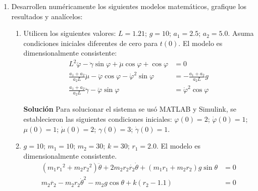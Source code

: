 \documentclass[letterpaper, 12pt]{article}
\begin{document}
\begin{enumerate}
\item Desarrollen numéricamente los siguientes modelos matemáticos, grafique los resultados y analícelos:
\begin{enumerate}
\item Utilicen los siguientes valores:
$L = 1.21$; $g = 10$; $a_1 = 2.5$; $a_2 = 5.0$. Asuma condiciones iniciales diferentes de cero para $t(0)$. El modelo es dimensionalmente consistente:
\begin{equation}
\begin{split}
    L^2\ddot{\varphi} - \ddot{\gamma}\sin \varphi + \ddot{\mu}\cos \varphi + \cos \varphi &= 0 \\
    \frac{a_1+a_2}{a_2L}\ddot{\mu} - \ddot{\varphi}\cos \varphi - \dot{\varphi}^2\sin \varphi &= - \frac{a_1+a_2}{a_2L}g \\
    \frac{a_1+a_2}{a_2L}\ddot{\gamma} - \ddot{\varphi}\sin \varphi &= \dot{\varphi}^2\cos \varphi
\end{split}
\end{equation}

\textbf{Solución}
Para solucionar el sistema se usó MATLAB y Simulink, se establecieron las siguientes condiciones iniciales:
$\varphi(0) = 2$; $\dot{\varphi}(0) = 1$; $\mu(0) = 1$; $\dot{\mu}(0) = 2$; $\gamma(0) = 3$; $\dot{\gamma}(0) = 1$.










\item $g = 10$; $m_1 = 10$; $m_2 = 30$; $k = 30$; $r_1 = 2.0$. El modelo es dimensionalmente consistente.
\begin{equation}
\begin{split}
    \left(m_1{r_1}^2 + m_2{r_2}^2\right)\ddot{\theta} + 2m_2r_2\dot{r_2}\dot{\theta} + \left(m_1r_1 + m_2r_2\right)g\sin \theta &= 0 \\
    m_2\ddot{r_2} - m_2r_2{\dot{\theta}}^2 - m_2g\cos \theta + k\left(r_2 - 1.1\right) &= 0
\end{split}
\end{equation}










\end{enumerate}
\end{enumerate}
\end{document}
